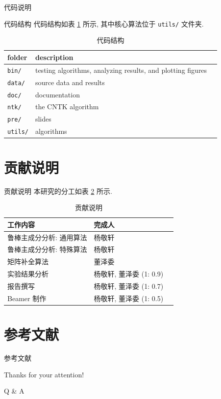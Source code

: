 \documentclass{beamer}
\begin{document}
\begin{frame}{代码说明}
  \begin{block}{代码结构}
    代码结构如表 \ref{tab:code_framework} 所示, 其中核心算法位于 \texttt{utils/} 文件夹.
  \end{block}
  \begin{table}[H]
    \centering
    \scriptsize
    \caption{代码结构}
    \label{tab:code_framework}
    \begin{tabular}{lll}
      \toprule
      folder & description    \\
      \midrule
      \texttt{bin/}    &  testing algorithms, analyzing results, and plotting figures   \\
      \texttt{data/}    &  source data and results   \\
      \texttt{doc/}    &  documentation   \\
      \texttt{ntk/}    &  the CNTK algorithm   \\
      \texttt{pre/}    &  slides   \\
      \texttt{utils/}    &  algorithms   \\
      \bottomrule
    \end{tabular}
  \end{table}
\end{frame}

\section[贡献]{贡献说明}

\begin{frame}{贡献说明}
  本研究的分工如表 \ref{tab:contribution} 所示.

  \begin{table}[htbp]
    \centering
    \small
    \caption{贡献说明}
    \label{tab:contribution}
    \begin{tabular}{lll}
      \toprule
      工作内容 & 完成人    \\
      \midrule
      鲁棒主成分分析: 通用算法 & 杨敬轩 \\
      鲁棒主成分分析: 特殊算法 & 杨敬轩 \\
      矩阵补全算法 & 董泽委 \\
      实验结果分析 & 杨敬轩, 董泽委 (1: 0.9) \\
      报告撰写 & 杨敬轩, 董泽委 (1: 0.7) \\
      Beamer 制作 & 杨敬轩, 董泽委 (1: 0.5) \\
      \bottomrule
    \end{tabular}
  \end{table}
\end{frame}

\section{参考文献}

\begin{frame}[allowframebreaks]{参考文献}
  \footnotesize
  
  
\end{frame}

\begin{frame}
  \begin{center}
    {\Huge\calligra Thanks for your attention!}
    \vspace{1cm}

    {\Huge Q \& A}
  \end{center}
\end{frame}
\end{document}
